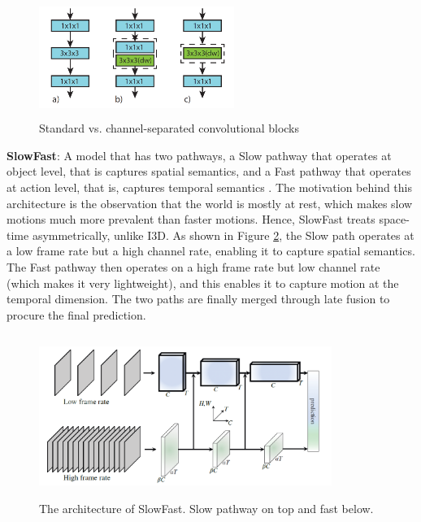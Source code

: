 \documentclass[extern,palatino]{cgMA}
\begin{document}
\begin{figure}[h]
\center
\includegraphics[height={110pt}, width={180pt}]{images/csn_architecture.png}
\caption{Standard vs. channel-separated convolutional blocks \cite{tran2019video}}
\label{csn_architecture}
\end{figure}

\bigskip
\noindent\textbf{SlowFast}: A model that has two pathways, a Slow pathway that operates at object level, that is captures spatial semantics, and a Fast pathway that operates at action level, that is, captures temporal semantics \cite{feichtenhofer2019slowfast}. The motivation behind this architecture is the observation that the world is mostly at rest, which makes slow motions much more prevalent than faster motions. Hence, SlowFast treats space-time asymmetrically, unlike I3D. As shown in Figure \ref{slowfast_architecture}, the Slow path operates at a low frame rate but a high channel rate, enabling it to capture spatial semantics. The Fast pathway then operates on a high frame rate but low channel rate (which makes it very lightweight), and this enables it to capture motion at the temporal dimension. The two paths are finally merged through late fusion to procure the final prediction.

\begin{figure}[h]
\center
\includegraphics[height={150pt}, width={270pt}]{images/slowfast_architecture.png}
\caption{The architecture of SlowFast. Slow pathway on top and fast below. \cite{feichtenhofer2019slowfast}}
\label{slowfast_architecture}
\end{figure}
\end{document}
